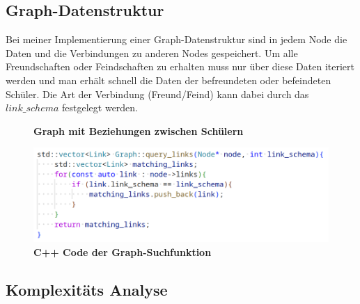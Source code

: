 \documentclass[11pt,a4paper]{article}
\begin{document}
\subsection{Graph-Datenstruktur}

Bei meiner Implementierung einer Graph-Datenstruktur sind in jedem Node
die Daten und die Verbindungen zu anderen Nodes gespeichert.
Um alle Freundschaften oder Feindschaften zu erhalten muss nur über diese
Daten iteriert werden und man erhält schnell die Daten der befreundeten oder
befeindeten Schüler. Die Art der Verbindung (Freund/Feind) kann dabei durch
das $link\_schema$ festgelegt werden.

\begin{figure}[H]
    \centering
    \caption{\textbf{Graph mit Beziehungen zwischen Schülern}}
\end{figure}

\vspace*{0.5cm}

\begin{figure}[H]
    \centering
    \includegraphics[width=1.0\textwidth]{./res/code_graphdb.png}
    \caption{\textbf{C++ Code der Graph-Suchfunktion}}
\end{figure}

\subsection{Komplexitäts Analyse}
\end{document}
